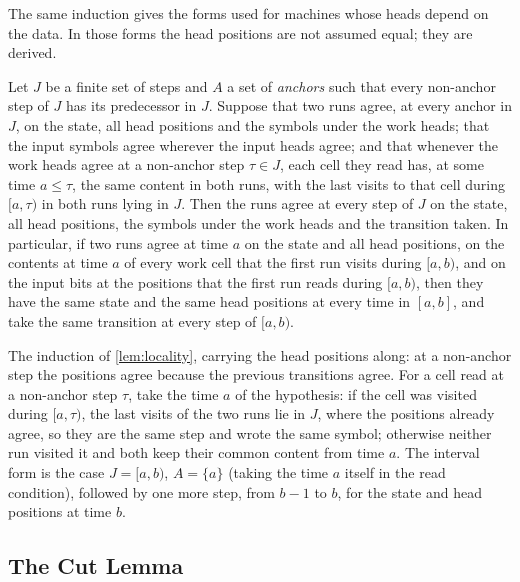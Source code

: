 The same induction gives the forms used for machines whose heads depend on the data. In those
forms the head positions are not assumed equal; they are derived.

\begin{lemma}\label{lem:locality-core}
Let $J$ be a finite set of steps and $A$ a set of \emph{anchors} such that every non-anchor step of $J$
has its predecessor in $J$. Suppose that two runs agree, at every anchor in $J$, on the state, all
head positions and the symbols under the work heads; that the input symbols agree wherever the
input heads agree; and that whenever the work heads agree at a non-anchor step $\tau\in J$, each
cell they read has, at some time $a\le\tau$, the same content in both runs, with the last visits
to that cell during $[a,\tau)$ in both runs lying in $J$. Then the runs agree at every step of $J$
on the state, all head positions, the symbols under the work heads and the transition taken. In
particular, if two runs agree at time $a$ on the state and all head positions, on the contents at
time $a$ of every work cell that the first run visits during $[a,b)$, and on the input bits at the
positions that the first run reads during $[a,b)$, then they have the same state and the same head
positions at every time in $[a,b]$, and take the same transition at every step of $[a,b)$.
\end{lemma}

\begin{outline}
The induction of \cref{lem:locality}, carrying the head positions along: at a non-anchor step the
positions agree because the previous transitions agree. For a cell read at a non-anchor step $\tau$, take
the time $a$ of the hypothesis: if the cell was visited during $[a,\tau)$, the last visits of the two runs
lie in $J$, where the positions already agree, so they are the same step and wrote the same symbol;
otherwise neither run visited it and both keep their common content from time $a$. The interval form is
the case $J=[a,b)$, $A=\{a\}$ (taking the time $a$ itself in the read condition), followed by one more
step, from $b-1$ to $b$, for the state and head positions at time $b$.
\end{outline}

\subsection{The Cut Lemma}

